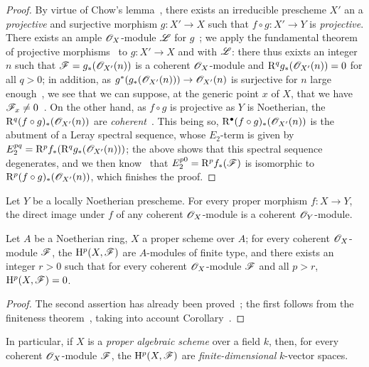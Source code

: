 \begin{proof}
By virtue of Chow's lemma~, there exists an irreducible prescheme $X'$ an a \emph{projective} and surjective morphism $g:X'\to X$ such that $f\circ g:X'\to Y$ is \emph{projective}.
There exists an ample $\mathscr{O}_X$-module $\mathscr{L}$ for $g$~; we apply the fundamental theorem of projective morphisms~ to $g:X'\to X$ and with $\mathscr{L}$: there thus exixts an integer $n$ such that $\mathscr{F}=g_*(\mathscr{O}_{X'}(n))$ is a coherent $\mathscr{O}_X$-module and $\mathrm{R}^q g_*(\mathscr{O}_{X'}(n))=0$ for all $q>0$; in addition, as $g^*(g_*(\sh{O}_{X'}(n)))\to\sh{O}_{X'}(n)$ is surjective for $n$ large enough~, we see that we can suppose, at the generic point $x$ of $X$, that we have $\mathscr{F}_x\neq 0$~.
On the other hand, as $f\circ g$ is projective as $Y$ is Noetherian, the $\mathrm{R}^q(f\circ g)_*(\mathscr{O}_{X'}(n))$ are \emph{coherent}~.
This being so, $\mathrm{R}^\bullet(f\circ g)_*(\mathscr{O}_{X'}(n))$ is the abutment of a Leray spectral sequence, whose $E_2$-term is given by $E_2^{pq}=\mathrm{R}^p f_*(\mathrm{R}^q g_*(\mathscr{O}_{X'}(n)))$; the above shows that this spectral sequence degenerates, and we then know~ that $E_2^{p0}=\mathrm{R}^p f_*(\mathscr{F})$ is isomorphic to $\mathrm{R}^p(f\circ g)_*(\mathscr{O}_{X'}(n))$, which finishes the proof.
\end{proof}

\begin{corollary}[3.2.2]
\label{III.3.2.2}
Let $Y$ be a locally Noetherian prescheme.
For every proper morphism $f:X\to Y$, the direct image under $f$ of any coherent $\mathscr{O}_X$-module is a coherent $\mathscr{O}_Y$-module.
\end{corollary}

\begin{corollary}[3.2.3]
\label{III.3.2.3}
Let $A$ be a Noetherian ring, $X$ a proper scheme over $A$; for every coherent $\mathscr{O}_X$-module $\mathscr{F}$, the $\mathrm{H}^p(X,\mathscr{F})$ are $A$-modules of finite type, and there exists an integer $r>0$ such that for every coherent $\mathscr{O}_X$-module $\mathscr{F}$ and all $p>r$, $\mathrm{H}^p(X,\mathscr{F})=0$.
\end{corollary}

\begin{proof}
The second assertion has already been proved~; the first follows from the finiteness theorem~, taking into account Corollary~.
\end{proof}

In particular, if $X$ is a \emph{proper algebraic scheme} over a field $k$, then, for every coherent $\mathscr{O}_X$-module $\mathscr{F}$, the $\mathrm{H}^p(X,\mathscr{F})$ are \emph{finite-dimensional} $k$-vector spaces.


